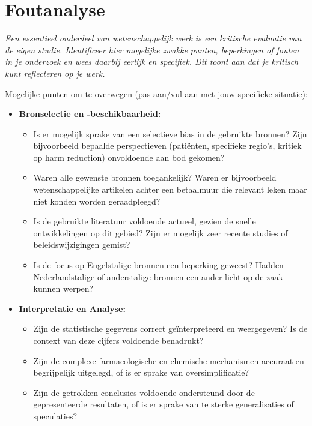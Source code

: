 \documentclass[11pt, a4paper]{report} %
\begin{document}
\chapter{Foutanalyse}
\label{chap:foutanalyse}

\textit{Een essentieel onderdeel van wetenschappelijk werk is een kritische evaluatie van de eigen studie. Identificeer hier mogelijke zwakke punten, beperkingen of fouten in je onderzoek en wees daarbij eerlijk en specifiek. Dit toont aan dat je kritisch kunt reflecteren op je werk.}

Mogelijke punten om te overwegen (pas aan/vul aan met jouw specifieke situatie):
\begin{itemize}
    \item \textbf{Bronselectie en -beschikbaarheid:}
        \begin{itemize}
            \item Is er mogelijk sprake van een selectieve bias in de gebruikte bronnen? Zijn bijvoorbeeld bepaalde perspectieven (patiënten, specifieke regio's, kritiek op harm reduction) onvoldoende aan bod gekomen?
            \item Waren alle gewenste bronnen toegankelijk? Waren er bijvoorbeeld wetenschappelijke artikelen achter een betaalmuur die relevant leken maar niet konden worden geraadpleegd?
            \item Is de gebruikte literatuur voldoende actueel, gezien de snelle ontwikkelingen op dit gebied? Zijn er mogelijk zeer recente studies of beleidswijzigingen gemist?
            \item Is de focus op Engelstalige bronnen een beperking geweest? Hadden Nederlandstalige of anderstalige bronnen een ander licht op de zaak kunnen werpen?
        \end{itemize}
    \item \textbf{Interpretatie en Analyse:}
        \begin{itemize}
            \item Zijn de statistische gegevens correct geïnterpreteerd en weergegeven? Is de context van deze cijfers voldoende benadrukt?
            \item Zijn de complexe farmacologische en chemische mechanismen accuraat en begrijpelijk uitgelegd, of is er sprake van oversimplificatie?
            \item Zijn de getrokken conclusies voldoende ondersteund door de gepresenteerde resultaten, of is er sprake van te sterke generalisaties of speculaties?

\end{itemize}
\end{itemize}
\end{document}
